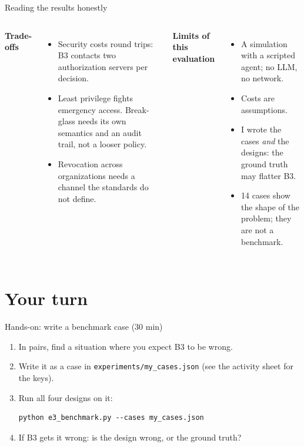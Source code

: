\documentclass[aspectratio=169, 10pt]{beamer}
\begin{document}
\begin{frame}{Reading the results honestly}
  \begin{columns}[T]
    \textbf{Trade-offs}
    \begin{itemize}\small
      \item Security costs round trips: B3 contacts two authorization servers per decision.
      \item Least privilege fights emergency access. Break-glass needs its own semantics and an audit trail, not a looser policy.
      \item Revocation across organizations needs a channel the standards do not define.
    \end{itemize}
    \textbf{Limits of this evaluation}
    \begin{itemize}\small
      \item A simulation with a scripted agent; no LLM, no network.
      \item Costs are assumptions.
      \item I wrote the cases \emph{and} the designs: the ground truth may flatter B3.
      \item 14 cases show the shape of the problem; they are not a benchmark.
    \end{itemize}
  \end{columns}
\end{frame}

\section{Your turn}

\begin{frame}[fragile]{Hands-on: write a benchmark case (30 min)}
  \small
  \begin{enumerate}
    \item In pairs, find a situation where you expect B3 to be wrong.
    \item Write it as a case in \texttt{experiments/my\_cases.json} (see the activity sheet for the keys).
    \item Run all four designs on it:
\begin{verbatim}
python e3_benchmark.py --cases my_cases.json
\end{verbatim}
    \item If B3 gets it wrong: is the design wrong, or the ground truth?
  \end{enumerate}
\end{frame}
\end{document}
